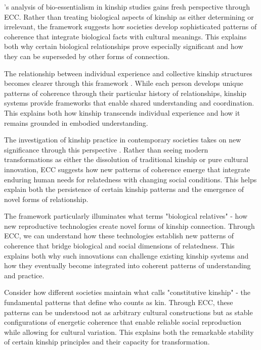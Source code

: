 \begin{refsection}
\cite{wilson2016kinship}'s analysis of bio-essentialism in kinship studies gains fresh perspective through ECC. Rather than treating biological aspects of kinship as either determining or irrelevant, the framework suggests how societies develop sophisticated patterns of coherence that integrate biological facts with cultural meanings. This explains both why certain biological relationships prove especially significant and how they can be superseded by other forms of connection.

The relationship between individual experience and collective kinship structures becomes clearer through this framework \cite{mckinnon2005neoliberal}. While each person develops unique patterns of coherence through their particular history of relationships, kinship systems provide frameworks that enable shared understanding and coordination. This explains both how kinship transcends individual experience and how it remains grounded in embodied understanding.

The investigation of kinship practice in contemporary societies takes on new significance through this perspective \cite{carsten2004after}. Rather than seeing modern transformations as either the dissolution of traditional kinship or pure cultural innovation, ECC suggests how new patterns of coherence emerge that integrate enduring human needs for relatedness with changing social conditions. This helps explain both the persistence of certain kinship patterns and the emergence of novel forms of relationship.

The framework particularly illuminates what \cite{franklin2013biological} terms "biological relatives" - how new reproductive technologies create novel forms of kinship connection. Through ECC, we can understand how these technologies establish new patterns of coherence that bridge biological and social dimensions of relatedness. This explains both why such innovations can challenge existing kinship systems and how they eventually become integrated into coherent patterns of understanding and practice.

Consider how different societies maintain what \cite{sahlins2013what} calls "constitutive kinship" - the fundamental patterns that define who counts as kin. Through ECC, these patterns can be understood not as arbitrary cultural constructions but as stable configurations of energetic coherence that enable reliable social reproduction while allowing for cultural variation. This explains both the remarkable stability of certain kinship principles and their capacity for transformation.


\end{refsection}
